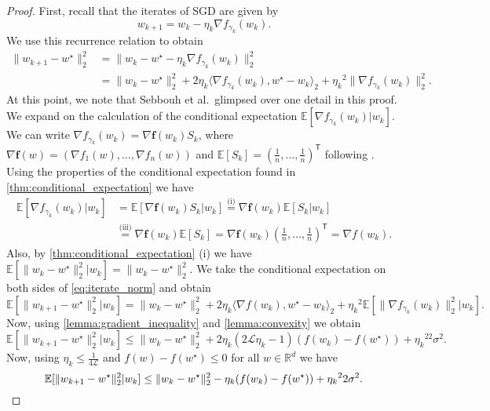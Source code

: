 \documentclass[12pt]{article}
\theoremstyle{definition}
\numberwithin{equation}{section}
\newcommand{\R}{\mathbb{R}}
\newcommand{\E}{\mathbb{E}}
\newcommand{\CL}{\mathcal{L}}
\newcommand{\T}{\mathsf{T}}
\newcommand{\ev}[1]{\mathbb{E}\left[{#1}\right]}
\newcommand{\norm}[1]{\lVert{#1}\rVert_2}
\newcommand{\scp}[2]{\langle{#1}, {#2}\rangle_2}
\begin{document}
\begin{proof}
  First, recall that the iterates of SGD are given by
  \begin{equation*}
    w_{k+1} = w_{k} - \eta_k \nabla f_{\gamma_k}(w_{k}).
  \end{equation*}
  We use this recurrence relation to obtain
  \begin{equation}
    \label{eq:iterate_norm}
    \begin{split}
      \norm{w_{k+1} - w^\star}^2 &= \norm{w_{k} - w^\star - \eta_k \nabla f_{\gamma_k}(w_{k})}^2 \\
    &= \norm{w_{k} - w^\star}^2 + 2 \eta_k \scp{\nabla f_{\gamma_k}(w_{k})}{ w^\star - w_{k}} + {\eta_k}^2\norm{\nabla f_{\gamma_k}(w_{k})}^2.
    \end{split}
  \end{equation}
  At this point, we note that Sebbouh et al.\ glimpsed over one detail in this proof. We expand on the calculation of the conditional expectation $\ev{\nabla f_{\gamma_k}(w_k)| w_k}$.
  We can write $\nabla f_{\gamma_k}(w_k) = \nabla \mathbf{f}(w_k)S_k$, where $\nabla \mathbf{f}(w) = \left(\nabla f_1(w), \dots, \nabla f_n(w)\right)$ and $\ev{S_k} = \left(\frac{1}{n}, \dots, \frac{1}{n}\right)^\T$ following \cite{wuNoisyGradientDescent2020a}. Using the properties of the conditional expectation found in \autoref{thm:conditional_expectation} we have
  \begin{align*}
    \ev{\nabla f_{\gamma_k}(w_k)|w_k} &= \ev{\nabla \mathbf{f}(w_k)S_k|w_k} \stackrel{\text{(i)}}{=} \nabla \mathbf{f}(w_k) \ev{S_k|w_k} \\
    &\stackrel{\text{(iii)}}{=} \nabla \mathbf{f}(w_k) \ev{S_k} = \nabla \mathbf{f}(w_k) \left(\frac{1}{n}, \dots, \frac{1}{n}\right)^\T = \nabla f(w_k).
  \end{align*}
  Also, by \autoref{thm:conditional_expectation} (i) we have $\ev{\norm{w_{k} - w^\star}^2|w_k} = \norm{w_{k} - w^\star}^2$.
  We take the conditional expectation on both sides of \eqref{eq:iterate_norm} and obtain
  \begin{equation*}
    \E[\norm{w_{k+1} - w^\star}^2|w_k] = \norm{w_{k} - w^\star}^2 + 2 \eta_k \scp{\nabla f(w_{k})}{w^\star - w_{k}}+ {\eta_k}^2\E[\norm{\nabla f_{\gamma_k}(w_{k})}^2|w_k].
  \end{equation*}
  Now, using \autoref{lemma:gradient_inequality} and \autoref{lemma:convexity} we obtain
  \begin{equation*}
    \E[\norm{w_{k+1} - w^\star}^2|w_k] \leq \norm{w_{k} - w^\star}^2 + 2 \eta_k(2\CL \eta_k - 1)(f(w_{k}) - f(w^\star))+ {\eta_k}^22\sigma^2.
  \end{equation*}
  Now, using $\eta_k \leq \frac{1}{4 \CL}$ and $f(w) - f(w^\star) \leq 0$ for all $w \in \R^d$ we have
  \begin{equation*}
    \E[\norm{w_{k+1} - w^\star}^2|w_k] \leq \norm{w_{k} - w^\star}^2 - \eta_k(f(w_{k}) - f(w^\star))+ {\eta_k}^22\sigma^2. \qedhere
  \end{equation*}
\end{proof}
\end{document}
